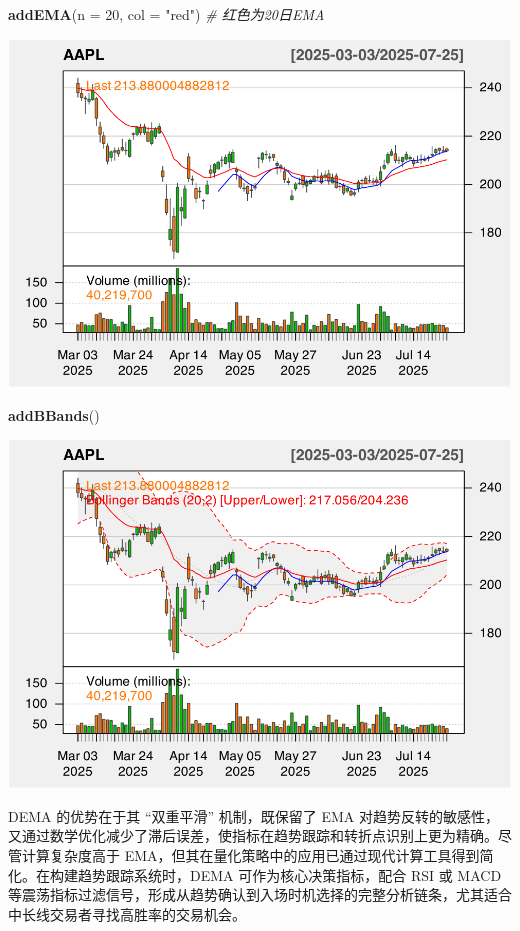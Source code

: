 \documentclass[]{ctexbook}
\newenvironment{Shaded}{\begin{snugshade}}{\end{snugshade}}
\newcommand{\AttributeTok}[1]{\textcolor[rgb]{0.13,0.29,0.53}{#1}}
\newcommand{\CommentTok}[1]{\textcolor[rgb]{0.56,0.35,0.01}{\textit{#1}}}
\newcommand{\DecValTok}[1]{\textcolor[rgb]{0.00,0.00,0.81}{#1}}
\newcommand{\FunctionTok}[1]{\textcolor[rgb]{0.13,0.29,0.53}{\textbf{#1}}}
\newcommand{\NormalTok}[1]{#1}
\newcommand{\StringTok}[1]{\textcolor[rgb]{0.31,0.60,0.02}{#1}}
\begin{document}
\begin{Shaded}
\begin{Highlighting}[]
\FunctionTok{addEMA}\NormalTok{(}\AttributeTok{n =} \DecValTok{20}\NormalTok{, }\AttributeTok{col =} \StringTok{"red"}\NormalTok{)      }\CommentTok{\# 红色为20日EMA}
\end{Highlighting}
\end{Shaded}

\includegraphics[width=0.9\linewidth]{QuantmodHandbook_files/figure-latex/dema_2-3}

\begin{Shaded}
\begin{Highlighting}[]
\FunctionTok{addBBands}\NormalTok{()}
\end{Highlighting}
\end{Shaded}

\includegraphics[width=0.9\linewidth]{QuantmodHandbook_files/figure-latex/dema_2-4}

DEMA 的优势在于其 ``双重平滑'' 机制，既保留了 EMA 对趋势反转的敏感性，又通过数学优化减少了滞后误差，使指标在趋势跟踪和转折点识别上更为精确。尽管计算复杂度高于 EMA，但其在量化策略中的应用已通过现代计算工具得到简化。在构建趋势跟踪系统时，DEMA 可作为核心决策指标，配合 RSI 或 MACD 等震荡指标过滤信号，形成从趋势确认到入场时机选择的完整分析链条，尤其适合中长线交易者寻找高胜率的交易机会。
\end{document}
